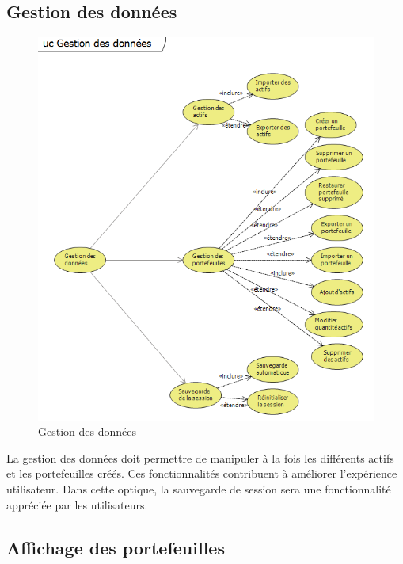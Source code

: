 \documentclass[a4paper]{report}
\begin{document}
\subsection{Gestion des données}
\begin{figure}[H]
  \center
  \includegraphics[width=1\textwidth]{Portefeuille.png}
  \caption{Gestion des données}
\end{figure}

La gestion des données doit permettre de manipuler à la fois les différents actifs et les portefeuilles créés.
Ces fonctionnalités contribuent à améliorer l'expérience utilisateur.
Dans cette optique, la sauvegarde de session sera une fonctionnalité appréciée par les utilisateurs.

\subsection{Affichage des portefeuilles}
\end{document}
